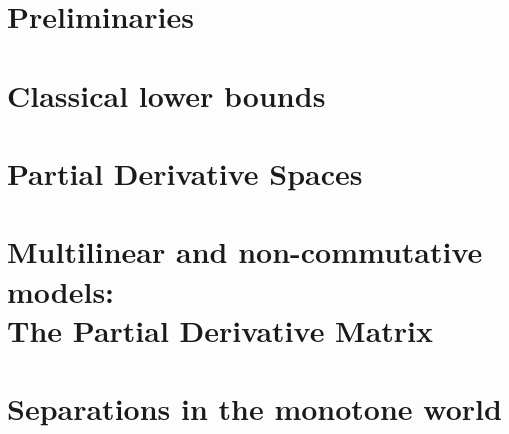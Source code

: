 \onehalfspace




\tableofcontents



\part{Preliminaries}










\part{Classical lower bounds}








\part{Partial Derivative Spaces}






\part[Multilinear and non-commutative models]{Multilinear and non-commutative models:\\The Partial Derivative Matrix}












\part{Separations in the monotone world}

